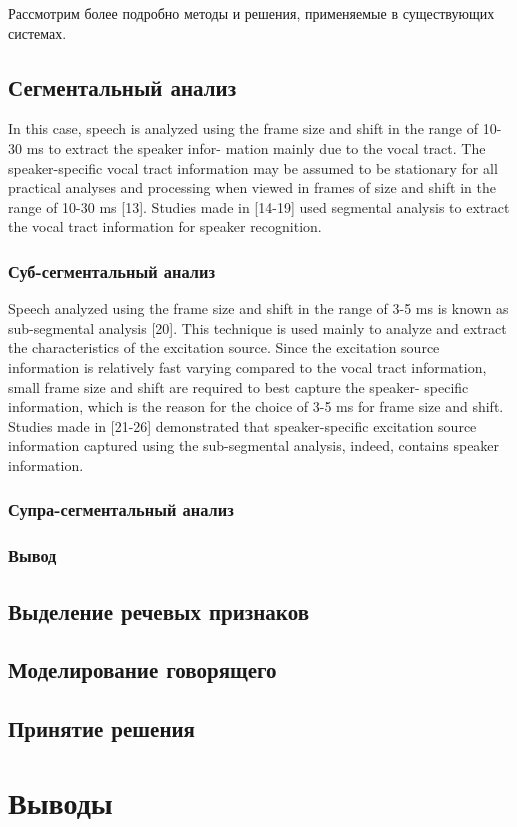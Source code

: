 Рассмотрим более подробно методы и решения, применяемые в существующих системах.

\subsection{Сегментальный анализ}

In this case, speech is analyzed using the frame size and
shift in the range of 10-30 ms to extract the speaker infor-
mation mainly due to the vocal tract. The speaker-specific
vocal tract information may be assumed to be stationary
for all practical analyses and processing when viewed
in frames of size and shift in the range of 10-30 ms [13].
Studies made in [14-19] used segmental analysis to extract
the vocal tract information for speaker recognition.

\subsubsection{Суб-сегментальный анализ}

 Speech analyzed using the frame size and shift in the
range of 3-5 ms is known as sub-segmental analysis [20].
This technique is used mainly to analyze and extract
the characteristics of the excitation source. Since the
excitation source information is relatively fast varying
compared to the vocal tract information, small frame
size and shift are required to best capture the speaker-
specific information, which is the reason for the choice of
3-5 ms for frame size and shift. Studies made in [21-26]
demonstrated that speaker-specific excitation source
information captured using the sub-segmental analysis,
indeed, contains speaker information.


\subsubsection{Супра-сегментальный анализ}

\subsubsection{Вывод}

\subsection{Выделение речевых признаков}

\subsection{Моделирование говорящего}

\subsection{Принятие решения}

\section{Выводы}
